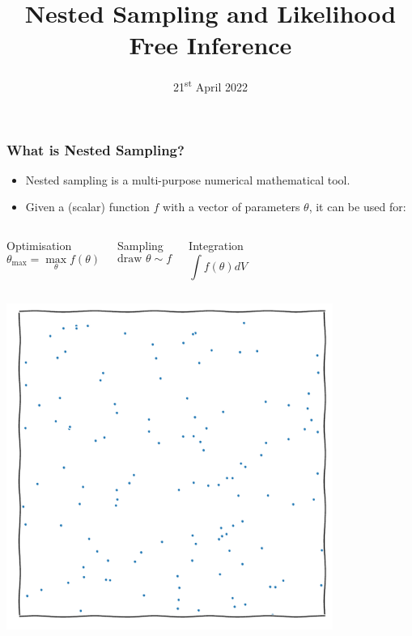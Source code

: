 \documentclass[aspectratio=169]{beamer}
\title{Nested Sampling and Likelihood Free Inference}
\date{21\textsuperscript{st} April 2022}
\begin{document}
\begin{frame}
    \titlepage
\end{frame}

\begin{frame}
    \frametitle{What is Nested Sampling?}
    \begin{itemize}
        \item Nested sampling is a multi-purpose numerical mathematical tool.
        \item Given a (scalar) function $f$ with a vector of parameters $\theta$, it can be used for:
    \end{itemize}
    \vspace{-10pt}
    \begin{columns}[t]
        \begin{block}{Optimisation}
            \vspace{-5pt}
            \[\theta_\mathrm{max} = \max_\theta{f(\theta)}\]
        \end{block}
        \begin{block}{Sampling}
            \vspace{-5pt}
            \[\text{draw }\theta\sim f\]
        \end{block}
        \begin{block}{Integration}
            \vspace{-5pt}
            \[\int f(\theta) dV \]
            \vspace{-15pt}
        \end{block}
    \end{columns}
    \begin{columns}[t]
            \centerline{\includegraphics[width=0.8\textwidth,page=13]{figures/himmelblau}}

\end{columns}
\end{frame}
\end{document}
